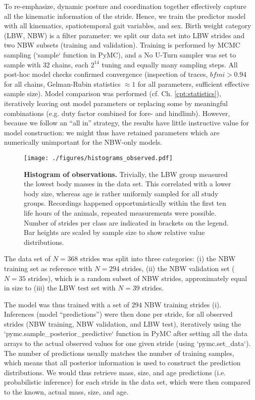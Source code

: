 To re-emphasize, dynamic posture and coordination together effectively capture all the kinematic information of the stride.
Hence, we train the predictor model with all kinematics, spatiotemporal gait variables, and sex.
Birth weight category (LBW, NBW) is a filter parameter: we split our data set into LBW strides and two NBW subsets (training and validation).
Training is performed by MCMC sampling (`sample` function in PyMC), and a No U-Turn sampler was set to sample with \(32\) chains, each \(2^{14}\) tuning and equally many sampling steps.
All post-hoc model checks confirmed convergence (inspection of traces, \(bfmi>0.94\) for all chains, Gelman-Rubin statistics \(\approx 1\) for all parameters, sufficient effective sample size).
Model comparison was performed (cf. Ch. \ref{cpt:statistics}), iteratively leaving out model parameters or replacing some by meaningful combinations (e.g. duty factor combined for fore- and hindlimb).
However, because we follow an ``all in'' strategy, the results have little instructive value for model construction: we might thus have retained parameters which are numerically unimportant for the NBW-only models.



\begin{figure}[p]
\centering
\texttt{[image: ./figures/histograms\_observed.pdf]}
\caption{\label{fig:observations}\textbf{Histogram of observations.} Trivially, the LBW group measured the lowest body masses in the data set. This correlated with a lower body size, whereas age is rather uniformly sampled for all study groups. Recordings happened opportunistically within the first ten life hours of the animals, repeated measurements were possible. Number of strides per class are indicated in brackets on the legend. Bar heights are scaled by sample size to show relative value distributions.}
\end{figure}


The data set of \(N = 368\) strides was split into three categories:
(i) the NBW training set as reference with \(N = 294\) strides,
(ii) the NBW validation set (\(N = 35\) strides), which is a random subset of NBW strides, approximately equal in size to
(iii) the LBW test set with \(N = 39\) strides.

The model was thus trained with a set of \(294\) NBW training strides (i).
Inferences (model ``predictions'') were then done per stride, for all observed strides (NBW training, NBW validation, and LBW test), iteratively using the `pymc.sample\_posterior\_predictive` function in PyMC after setting all the data arrays to the actual observed values for one given stride (using `pymc.set\_data`).
The number of predictions usually matches the number of training samples, which means that all posterior information is used to construct the prediction distributions.
We would thus retrieve mass, size, and age predictions (i.e. probabilistic inference) for each stride in the data set, which were then compared to the known, actual mass, size, and age.


